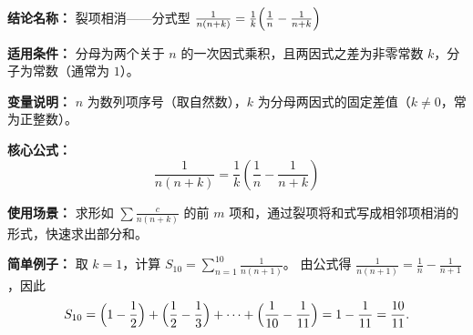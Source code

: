 \textbf{结论名称：} 裂项相消——分式型 \(\frac{1}{n(n+k)} = \frac{1}{k}\Bigl(\frac{1}{n} - \frac{1}{n+k}\Bigr)\)

\textbf{适用条件：} 分母为两个关于 \(n\) 的一次因式乘积，且两因式之差为非零常数 \(k\)，分子为常数（通常为 \(1\)）。

\textbf{变量说明：} \(n\) 为数列项序号（取自然数），\(k\) 为分母两因式的固定差值（\(k \neq 0\)，常为正整数）。

\textbf{核心公式：} \[ \boxed{ \frac{1}{n(n+k)} = \frac{1}{k}\left( \frac{1}{n} - \frac{1}{n+k} \right) } \]

\textbf{使用场景：} 求形如 \(\sum \frac{c}{n(n+k)}\) 的前 \(m\) 项和，通过裂项将和式写成相邻项相消的形式，快速求出部分和。

\textbf{简单例子：} 取 \(k=1\)，计算 \(S_{10} = \sum_{n=1}^{10} \frac{1}{n(n+1)}\)。
由公式得 \(\frac{1}{n(n+1)} = \frac{1}{n} - \frac{1}{n+1}\)，因此
\[ S_{10} = \Bigl(1 - \frac{1}{2}\Bigr) + \Bigl(\frac{1}{2} - \frac{1}{3}\Bigr) + \cdots + \Bigl(\frac{1}{10} - \frac{1}{11}\Bigr) = 1 - \frac{1}{11} = \frac{10}{11}. \]